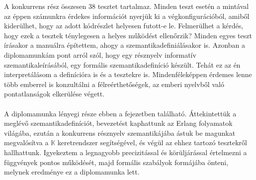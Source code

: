 A konkurrens rész összesen 38 tesztet tartalmaz. Minden teszt esetén a mintával az éppen számunkra érdekes információt nyerjük ki a végkonfigurációból, amiből kiderülhet, hogy az adott kódrészlet helyesen futott-e le. Felmerülhet a kérdés, hogy ezek a tesztek ténylegesen a helyes működést ellenőrzik? Minden egyes teszt írásakor a manuálra építettem, ahogy a szemantikadefiniálásakor is. Azonban a diplomamunkám pont arról szól, hogy egy résznyelv informatív szemantikaleírásából, egy formális szemantikadefiníció készült. Tehát ez az én interpretálásom a definícióra is és a tesztekre is. Mindenféleképpen érdemes lenne több emberrel is konzultálni a félreérthetőségek, az emberi nyelvből való pontatlanságok elkerülése végett.

\paragraph{}
A diplomamunka lényegi része ebben a fejezetben található. Áttekintettük a meglévő szemantikadefiníciót, bevezetést kaphattunk az Erlang folyamatok világába, ezután a konkurrens résznyelv szemantikájába ástuk be magunkat megvalósítva a $\mathbb{K}$ keretrendszer segítségével, és végül az ehhez tartozó tesztekről hallhattunk. Igyekeztem a legnagyobb precizitással és körüljárással értelmezni a függvények pontos működését, majd formális szabályok formájába önteni, melynek eredménye ez a diplomamunka lett.

